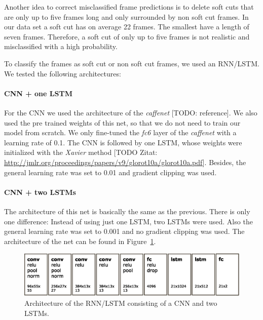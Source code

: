 Another idea to correct misclassified frame predictions is to delete soft cuts that are only up to five frames long and only surrounded by non soft cut frames.
In our data set a soft cut has on average 22 frames.
The smallest have a length of seven frames.
Therefore, a soft cut of only up to five frames is not realistic and misclassified with a high probability.

To classify the frames as soft cut or non soft cut frames, we used an RNN/LSTM.
We tested the following architectures:

\paragraph{CNN + one LSTM}
For the CNN we used the architecture of the \textit{caffenet} [TODO: reference].
We also used the pre trained weights of this net, so that we do not need to train our model from scratch.
We only fine-tuned the \textit{fc6} layer of the \textit{caffenet} with a learning rate of 0.1.
The CNN is followed by one LSTM, whose weights were initialized with the \textit{Xavier} method [TODO Zitat: \url{http://jmlr.org/proceedings/papers/v9/glorot10a/glorot10a.pdf}].
Besides, the general learning rate was set to 0.01 and gradient clipping was used.

\paragraph{CNN + two LSTMs}
The architecture of this net is basically the same as the previous.
There is only one difference: Instead of using just one LSTM, two LSTMs were used.
Also the general learning rate was set to 0.001 and no gradient clipping was used.
The architecture of the net can be found in Figure~\ref{fig:net_architecture}.
\begin{figure}[!htb]
	\centering
	\includegraphics[scale=.5]{images/net_architecture.eps}
	\caption{Architecture of the RNN/LSTM consisting of a CNN and two LSTMs.}
	\label{fig:net_architecture}
\end{figure}

